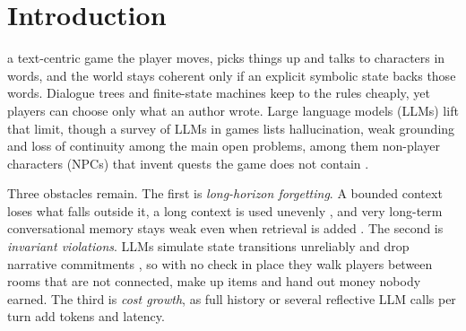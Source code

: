 \documentclass[letterpaper,journal]{IEEEtran}
\begin{document}
\section{Introduction}\label{sec:intro}

 a text-centric game the player moves, picks things up and talks to characters in words, and the world stays coherent only if an explicit symbolic state backs those words. Dialogue trees and finite-state machines keep to the rules cheaply, yet players can choose only what an author wrote. Large language models (LLMs) lift that limit, though a survey of LLMs in games lists hallucination, weak grounding and loss of continuity among the main open problems, among them non-player characters (NPCs) that invent quests the game does not contain \cite{gallotta2024llmgames}.

Three obstacles remain. The first is \emph{long-horizon forgetting}. A bounded context loses what falls outside it, a long context is used unevenly \cite{liu2024lost}, and very long-term conversational memory stays weak even when retrieval is added \cite{maharana2024locomo,wu2025longmemeval}. The second is \emph{invariant violations}. LLMs simulate state transitions unreliably \cite{wang2024worldsim,kim2023entity} and drop narrative commitments \cite{ma2026ncp}, so with no check in place they walk players between rooms that are not connected, make up items and hand out money nobody earned. The third is \emph{cost growth}, as full history or several reflective LLM calls per turn \cite{park2023generative,shinn2023reflexion} add tokens and latency.
\end{document}
